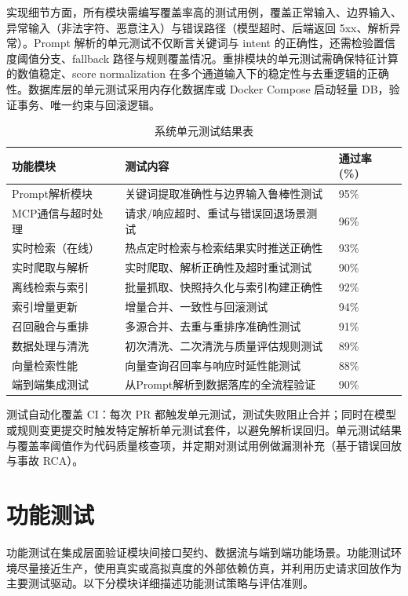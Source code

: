 实现细节方面，所有模块需编写覆盖率高的测试用例，覆盖正常输入、边界输入、异常输入（非法字符、恶意注入）与错误路径（模型超时、后端返回 5xx、解析异常）。Prompt 解析的单元测试不仅断言关键词与 intent 的正确性，还需检验置信度阈值分支、fallback 路径与规则覆盖情况。重排模块的单元测试需确保特征计算的数值稳定、score normalization 在多个通道输入下的稳定性与去重逻辑的正确性。数据库层的单元测试采用内存化数据库或 Docker Compose 启动轻量 DB，验证事务、唯一约束与回滚逻辑。
\begin{table}[htb]
\centering
\caption{系统单元测试结果表}
\label{tab:unit-test-system}
{\renewcommand{\arraystretch}{1.2}
\begin{tabular}{p{4cm} p{7cm} p{2cm}}
\hline
功能模块 & 测试内容 & 通过率 (\%) \\
\hline
Prompt解析模块 & 关键词提取准确性与边界输入鲁棒性测试 & 95\% \\ \hline
MCP通信与超时处理 & 请求/响应超时、重试与错误回退场景测试 & 96\% \\ \hline
实时检索（在线） & 热点定时检索与检索结果实时推送正确性 & 93\% \\ \hline
实时爬取与解析 & 实时爬取、解析正确性及超时重试测试 & 90\% \\ \hline
离线检索与索引 & 批量抓取、快照持久化与索引构建正确性 & 92\% \\ \hline
索引增量更新 & 增量合并、一致性与回滚测试 & 94\% \\ \hline
召回融合与重排 & 多源合并、去重与重排序准确性测试 & 91\% \\ \hline
数据处理与清洗 & 初次清洗、二次清洗与质量评估规则测试 & 89\% \\ \hline
向量检索性能 & 向量查询召回率与响应时延性能测试 & 88\% \\ \hline
端到端集成测试 & 从Prompt解析到数据落库的全流程验证 & 90\% \\ \hline
\end{tabular}
}
\end{table}
测试自动化覆盖 CI：每次 PR 都触发单元测试，测试失败阻止合并；同时在模型或规则变更提交时触发特定解析单元测试套件，以避免解析误回归。单元测试结果与覆盖率阈值作为代码质量核查项，并定期对测试用例做漏测补充（基于错误回放与事故 RCA）。
\section{功能测试}
功能测试在集成层面验证模块间接口契约、数据流与端到端功能场景。功能测试环境尽量接近生产，使用真实或高拟真度的外部依赖仿真，并利用历史请求回放作为主要测试驱动。以下分模块详细描述功能测试策略与评估准则。
